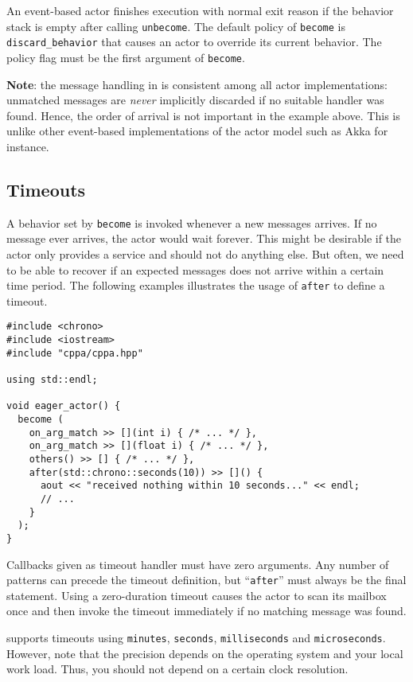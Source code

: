An event-based actor finishes execution with normal exit reason if the behavior stack is empty after calling \lstinline^unbecome^.
The default policy of \lstinline^become^ is \lstinline^discard_behavior^ that causes an actor to override its current behavior.
The policy flag must be the first argument of \lstinline^become^.

\textbf{Note}: the message handling in \libcppa is consistent among all actor implementations: unmatched messages are \textit{never} implicitly discarded if no suitable handler was found.
Hence, the order of arrival is not important in the example above.
This is unlike other event-based implementations of the actor model such as Akka for instance.

\clearpage
\subsection{Timeouts}
\label{Sec::Receive::Timeouts}

A behavior set by \lstinline^become^ is invoked whenever a new messages arrives.
If no message ever arrives, the actor would wait forever.
This might be desirable if the actor only provides a service and should not do anything else.
But often, we need to be able to recover if an expected messages does not arrive within a certain time period. The following examples illustrates the usage of \lstinline^after^ to define a timeout.

\begin{lstlisting}
#include <chrono>
#include <iostream>
#include "cppa/cppa.hpp"

using std::endl;

void eager_actor() {
  become (
    on_arg_match >> [](int i) { /* ... */ },
    on_arg_match >> [](float i) { /* ... */ },
    others() >> [] { /* ... */ },
    after(std::chrono::seconds(10)) >> []() {
      aout << "received nothing within 10 seconds..." << endl;
      // ...
    }
  );
}
\end{lstlisting}

Callbacks given as timeout handler must have zero arguments.
Any number of patterns can precede the timeout definition, but  ``\lstinline^after^'' must always be the final statement.
Using a zero-duration timeout causes the actor to scan its mailbox once and then invoke the timeout immediately if no matching message was found.

\libcppa supports timeouts using \lstinline^minutes^, \lstinline^seconds^, \lstinline^milliseconds^ and \lstinline^microseconds^.
However, note that the precision depends on the operating system and your local work load.
Thus, you should not depend on a certain clock resolution.


